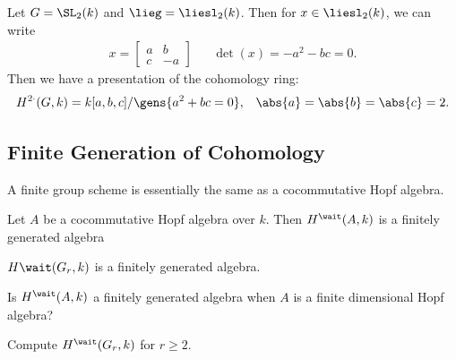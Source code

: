 \begin{example}[?]

Let \(G = \SL_2(k)\) and \(\lieg = \liesl_2(k)\). Then for
\(x\in \liesl_2(k)\), we can write
\begin{align*}  
x = \begin{bmatrix}
a & b \\
c & -a
\end{bmatrix} && \det(x) = -a^2 - bc = 0
.\end{align*} Then we have a presentation of the cohomology ring:
\begin{align*}  
H^{2\cdot}(G, k) = k[a,b,c] / \gens{a^2 + bc = 0}, && \abs{a} = \abs{b} = \abs{c} = 2
.\end{align*}

\end{example}

\hypertarget{finite-generation-of-cohomology}{%
\subsection{Finite Generation of
Cohomology}\label{finite-generation-of-cohomology}}

A finite group scheme is essentially the same as a cocommutative Hopf
algebra.

\begin{theorem}

Let \(A\) be a cocommutative Hopf algebra over \(k\). Then
\(H^\wait(A, k)\) is a finitely generated algebra

\end{theorem}

\begin{example}[?]

\(H\wait(G_r, k)\) is a finitely generated algebra.

\end{example}

\begin{problem}[Open]

Is \(H^\wait(A, k)\) a finitely generated algebra when \(A\) is a finite
dimensional Hopf algebra?

\end{problem}

\begin{problem}[Open]

Compute \(H^\wait(G_r, k)\) for \(r\geq 2\).

\end{problem}

